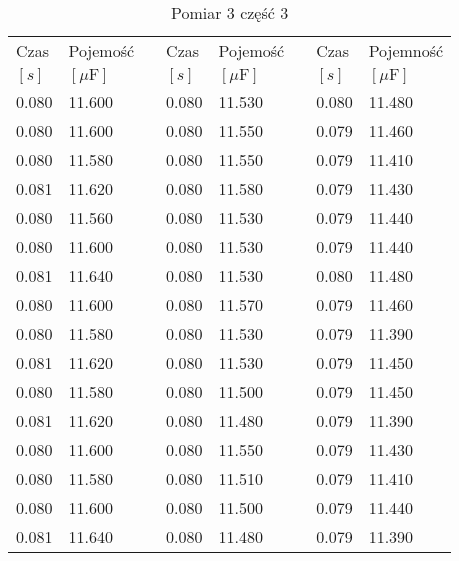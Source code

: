 \documentclass[12pt]{mwrep}
\begin{document}
	\begin{table}[H]\caption{Pomiar 3 część 3}\label{tab:3v3}
		\begin{tabularx}{\textwidth}{|Y|Y|p{2mm}|Y|Y|p{2mm}|Y|Y|}
			Czas & Pojemość && Czas & Pojemość && Czas & Pojemność \\
			$[s]$ & $[\mu\text{F}]$ && $[s]$ & $[\mu\text{F}]$ && $[s]$ & $[\mu\text{F}]$ \\
			0.080 & 11.600 && 0.080 & 11.530 && 0.080 & 11.480 \\
			0.080 & 11.600 && 0.080 & 11.550 && 0.079 & 11.460 \\
			0.080 & 11.580 && 0.080 & 11.550 && 0.079 & 11.410 \\
			0.081 & 11.620 && 0.080 & 11.580 && 0.079 & 11.430 \\
			0.080 & 11.560 && 0.080 & 11.530 && 0.079 & 11.440 \\
			0.080 & 11.600 && 0.080 & 11.530 && 0.079 & 11.440 \\
			0.081 & 11.640 && 0.080 & 11.530 && 0.080 & 11.480 \\
			0.080 & 11.600 && 0.080 & 11.570 && 0.079 & 11.460 \\
			0.080 & 11.580 && 0.080 & 11.530 && 0.079 & 11.390 \\
			0.081 & 11.620 && 0.080 & 11.530 && 0.079 & 11.450 \\
			0.080 & 11.580 && 0.080 & 11.500 && 0.079 & 11.450 \\
			0.081 & 11.620 && 0.080 & 11.480 && 0.079 & 11.390 \\
			0.080 & 11.600 && 0.080 & 11.550 && 0.079 & 11.430 \\
			0.080 & 11.580 && 0.080 & 11.510 && 0.079 & 11.410 \\
			0.080 & 11.600 && 0.080 & 11.500 && 0.079 & 11.440 \\
			0.081 & 11.640 && 0.080 & 11.480 && 0.079 & 11.390 \\

\end{tabularx}
\end{table}
\end{document}
